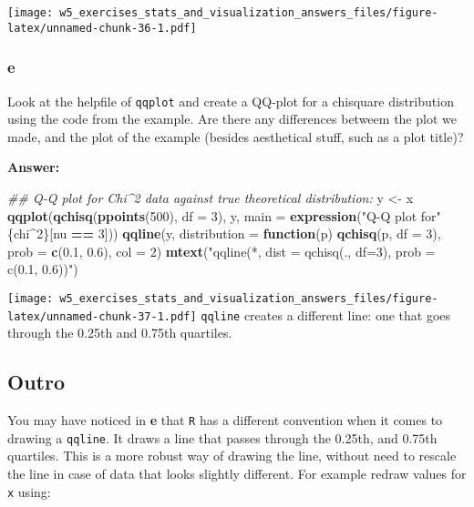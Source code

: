 \documentclass[]{article}
\newenvironment{Shaded}{\begin{snugshade}}{\end{snugshade}}
\newcommand{\CommentTok}[1]{\textcolor[rgb]{0.56,0.35,0.01}{\textit{#1}}}
\newcommand{\ControlFlowTok}[1]{\textcolor[rgb]{0.13,0.29,0.53}{\textbf{#1}}}
\newcommand{\DataTypeTok}[1]{\textcolor[rgb]{0.13,0.29,0.53}{#1}}
\newcommand{\DecValTok}[1]{\textcolor[rgb]{0.00,0.00,0.81}{#1}}
\newcommand{\ErrorTok}[1]{\textcolor[rgb]{0.64,0.00,0.00}{\textbf{#1}}}
\newcommand{\FloatTok}[1]{\textcolor[rgb]{0.00,0.00,0.81}{#1}}
\newcommand{\KeywordTok}[1]{\textcolor[rgb]{0.13,0.29,0.53}{\textbf{#1}}}
\newcommand{\NormalTok}[1]{#1}
\newcommand{\OperatorTok}[1]{\textcolor[rgb]{0.81,0.36,0.00}{\textbf{#1}}}
\newcommand{\StringTok}[1]{\textcolor[rgb]{0.31,0.60,0.02}{#1}}
\begin{document}
\texttt{[image: w5\_exercises\_stats\_and\_visualization\_answers\_files/figure-latex/unnamed-chunk-36-1.pdf]}

\hypertarget{e-2}{%
\subsubsection{e}\label{e-2}}

Look at the helpfile of \texttt{qqplot} and create a QQ-plot for a
chisquare distribution using the code from the example. Are there any
differences betweem the plot we made, and the plot of the example
(besides aesthetical stuff, such as a plot title)?

\textbf{Answer:}

\begin{Shaded}
\begin{Highlighting}[]
\CommentTok{## Q-Q plot for Chi^2 data against true theoretical distribution:}
\NormalTok{y <-}\StringTok{ }\NormalTok{x}
\KeywordTok{qqplot}\NormalTok{(}\KeywordTok{qchisq}\NormalTok{(}\KeywordTok{ppoints}\NormalTok{(}\DecValTok{500}\NormalTok{), }\DataTypeTok{df =} \DecValTok{3}\NormalTok{), y,}
       \DataTypeTok{main =} \KeywordTok{expression}\NormalTok{(}\StringTok{"Q-Q plot for"} \OperatorTok{~}\ErrorTok{~}\StringTok{ }\NormalTok{\{chi}\OperatorTok{^}\DecValTok{2}\NormalTok{\}[nu }\OperatorTok{==}\StringTok{ }\DecValTok{3}\NormalTok{]))}
\KeywordTok{qqline}\NormalTok{(y, }\DataTypeTok{distribution =} \ControlFlowTok{function}\NormalTok{(p) }\KeywordTok{qchisq}\NormalTok{(p, }\DataTypeTok{df =} \DecValTok{3}\NormalTok{),}
       \DataTypeTok{prob =} \KeywordTok{c}\NormalTok{(}\FloatTok{0.1}\NormalTok{, }\FloatTok{0.6}\NormalTok{), }\DataTypeTok{col =} \DecValTok{2}\NormalTok{)}
\KeywordTok{mtext}\NormalTok{(}\StringTok{"qqline(*, dist = qchisq(., df=3), prob = c(0.1, 0.6))"}\NormalTok{)}
\end{Highlighting}
\end{Shaded}

\texttt{[image: w5\_exercises\_stats\_and\_visualization\_answers\_files/figure-latex/unnamed-chunk-37-1.pdf]}
\texttt{qqline} creates a different line: one that goes through the
0.25th and 0.75th quartiles.

\hypertarget{outro}{%
\subsection{Outro}\label{outro}}

You may have noticed in \textbf{e} that \texttt{R} has a different
convention when it comes to drawing a \texttt{qqline}. It draws a line
that passes through the 0.25th, and 0.75th quartiles. This is a more
robust way of drawing the line, without need to rescale the line in case
of data that looks slightly different. For example redraw values for
\texttt{x} using:
\end{document}
